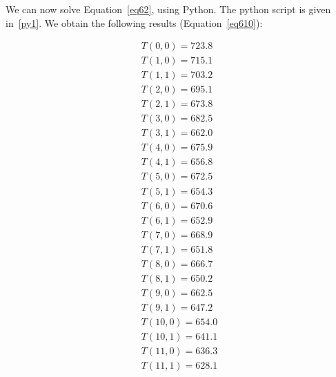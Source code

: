 \normalsize


We can now solve Equation~\ref{eq62}, using Python. The python script is given in~\ref{py1}. We obtain the following results (Equation~\ref{eq610}):

\begin{equation}\label{eq610}
\begin{aligned}
T(0,0) = 723.8 \\
T(1,0) = 715.1 \\
T(1,1) = 703.2 \\
T(2,0) = 695.1 \\
T(2,1) = 673.8 \\
T(3,0) = 682.5 \\
T(3,1) = 662.0 \\
T(4,0) = 675.9 \\
T(4,1) = 656.8 \\
T(5,0) = 672.5 \\
T(5,1) = 654.3 \\
T(6,0) = 670.6 \\
T(6,1) = 652.9 \\
T(7,0) = 668.9 \\
T(7,1) = 651.8 \\
T(8,0) = 666.7 \\
T(8,1) = 650.2 \\
T(9,0) = 662.5 \\
T(9,1) = 647.2 \\
T(10,0) = 654.0 \\
T(10,1) = 641.1 \\
T(11,0) = 636.3 \\
T(11,1) = 628.1
\end{aligned}
\end{equation}


\newpage
